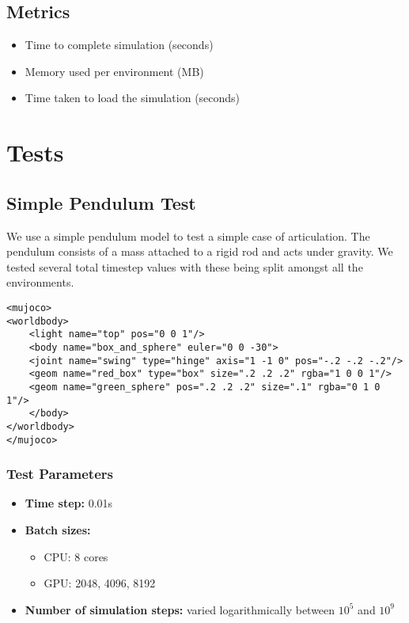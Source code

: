 \documentclass[11pt,a4paper]{article}
\begin{document}
\subsection{Metrics}
\begin{itemize}
    \item Time to complete simulation (seconds)
    \item Memory used per environment (MB)
    \item Time taken to load the simulation (seconds)
\end{itemize}

\section{Tests}
\subsection{Simple Pendulum Test}
We use a simple pendulum model to test a simple case of articulation. The pendulum consists of a mass attached to a rigid rod and acts under gravity. We tested several total timestep values with these being split amongst all the environments.

\begin{lstlisting}[style=xmlstyle, caption={Pendulum XML model}, label=lst:pendulum_xml]
<mujoco>
<worldbody>
    <light name="top" pos="0 0 1"/>
    <body name="box_and_sphere" euler="0 0 -30">
    <joint name="swing" type="hinge" axis="1 -1 0" pos="-.2 -.2 -.2"/>
    <geom name="red_box" type="box" size=".2 .2 .2" rgba="1 0 0 1"/>
    <geom name="green_sphere" pos=".2 .2 .2" size=".1" rgba="0 1 0 1"/>
    </body>
</worldbody>
</mujoco>
\end{lstlisting}

\subsubsection{Test Parameters}
\begin{itemize}
    \item \textbf{Time step:} 0.01s
    \item \textbf{Batch sizes:} 
    \begin{itemize}
        \item CPU: 8 cores 
        \item GPU: 2048, 4096, 8192
    \end{itemize}
    \item \textbf{Number of simulation steps:} varied logarithmically between $10^5$ and $10^9$
\end{itemize}
\end{document}
